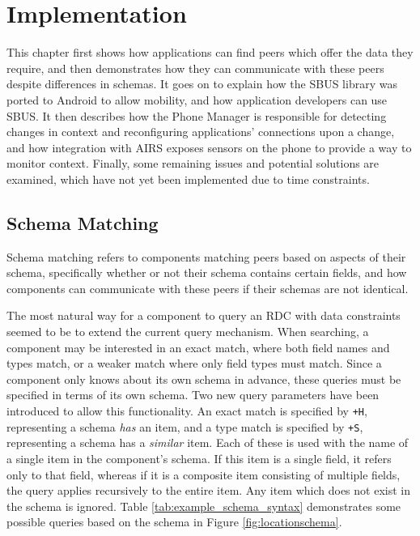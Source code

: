 \documentclass[12pt,twoside,notitlepage]{report}
\begin{document}
\cleardoublepage


\chapter{Implementation}

This chapter first shows how applications can find peers which offer the data they require, and then demonstrates how they can communicate with these peers despite differences in schemas. 
It goes on to explain how the SBUS library was ported to Android to allow mobility, and how application developers can use SBUS. 
It then describes how the Phone Manager is responsible for detecting changes in context and reconfiguring applications' connections upon a change, and how integration with AIRS exposes sensors on the phone to provide a way to monitor context. 
Finally, some remaining issues and potential solutions are examined, which have not yet been implemented due to time constraints. 

\section{Schema Matching}

Schema matching refers to components matching peers based on aspects of their schema, specifically whether or not their schema contains certain fields, and how components can communicate with these peers if their schemas are not identical. 

The most natural way for a component to query an RDC with data constraints seemed to be to extend the current query mechanism. 
When searching, a component may be interested in an exact match, where both field names and types match, or a weaker match where only field types must match. 
Since a component only knows about its own schema in advance, these queries must be specified in terms of its own schema.
Two new query parameters have been introduced to allow this functionality. 
An exact match is specified by {\tt +H}, representing a schema {\sl has} an item, and a type match is specified by {\tt +S}, representing a schema has a {\sl similar} item.
Each of these is used with the name of a single item in the component's schema.
If this item is a single field, it refers only to that field, whereas if it is a composite item consisting of multiple fields, the query applies recursively to the entire item. 
Any item which does not exist in the schema is ignored. 
Table \ref{tab:example_schema_syntax} demonstrates some possible queries based on the schema in Figure \ref{fig:locationschema}.
\end{document}
